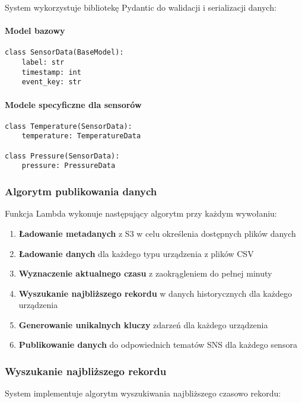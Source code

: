 System wykorzystuje bibliotekę Pydantic do walidacji i serializacji danych:

\paragraph{Model bazowy}
\begin{verbatim}
class SensorData(BaseModel):
    label: str
    timestamp: int
    event_key: str
\end{verbatim}

\paragraph{Modele specyficzne dla sensorów}
\begin{verbatim}
class Temperature(SensorData):
    temperature: TemperatureData

class Pressure(SensorData):
    pressure: PressureData
\end{verbatim}

\subsubsection{Algorytm publikowania danych}

Funkcja Lambda wykonuje następujący algorytm przy każdym wywołaniu:

\begin{enumerate}
    \item \textbf{Ładowanie metadanych} z S3 w celu określenia dostępnych plików danych
    \item \textbf{Ładowanie danych} dla każdego typu urządzenia z plików CSV
    \item \textbf{Wyznaczenie aktualnego czasu} z zaokrągleniem do pełnej minuty
    \item \textbf{Wyszukanie najbliższego rekordu} w danych historycznych dla każdego urządzenia
    \item \textbf{Generowanie unikalnych kluczy} zdarzeń dla każdego urządzenia
    \item \textbf{Publikowanie danych} do odpowiednich tematów SNS dla każdego sensora
\end{enumerate}

\subsubsection{Wyszukanie najbliższego rekordu}

System implementuje algorytm wyszukiwania najbliższego czasowo rekordu:

